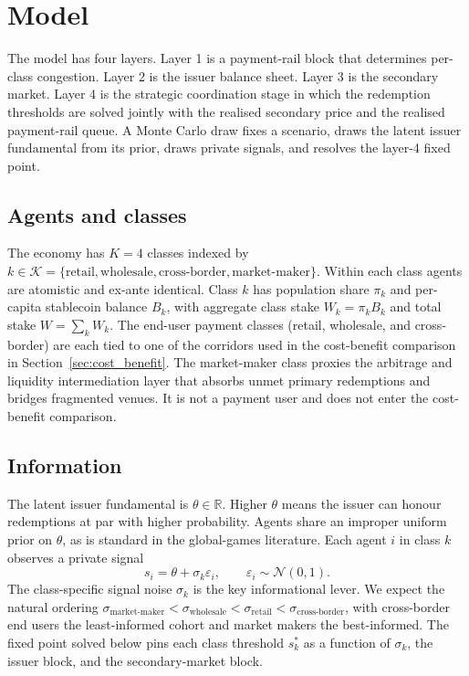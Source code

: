 \section{Model}\label{sec:model}

The model has four layers. Layer 1 is a payment-rail block that determines per-class congestion. Layer 2 is the issuer balance sheet. Layer 3 is the secondary market. Layer 4 is the strategic coordination stage in which the redemption thresholds are solved jointly with the realised secondary price and the realised payment-rail queue. A Monte Carlo draw fixes a scenario, draws the latent issuer fundamental from its prior, draws private signals, and resolves the layer-4 fixed point.

\subsection{Agents and classes}\label{sub:agents}

The economy has $K=4$ classes indexed by $k \in \mathcal{K} = \{\text{retail}, \text{wholesale}, \text{cross-border}, \text{market-maker}\}$. Within each class agents are atomistic and ex-ante identical. Class $k$ has population share $\pi_k$ and per-capita stablecoin balance $B_k$, with aggregate class stake $W_k = \pi_k B_k$ and total stake $W = \sum_k W_k$. The end-user payment classes (retail, wholesale, and cross-border) are each tied to one of the corridors used in the cost-benefit comparison in Section~\ref{sec:cost_benefit}. The market-maker class proxies the arbitrage and liquidity intermediation layer that absorbs unmet primary redemptions and bridges fragmented venues. It is not a payment user and does not enter the cost-benefit comparison.

\subsection{Information}\label{sub:information}

The latent issuer fundamental is $\theta \in \mathbb{R}$. Higher $\theta$ means the issuer can honour redemptions at par with higher probability. Agents share an improper uniform prior on $\theta$, as is standard in the global-games literature. Each agent $i$ in class $k$ observes a private signal
\begin{equation}\label{eq:signal}
s_i = \theta + \sigma_k \varepsilon_i, \qquad \varepsilon_i \sim \mathcal{N}(0,1).
\end{equation}
The class-specific signal noise $\sigma_k$ is the key informational lever. We expect the natural ordering $\sigma_{\text{market-maker}} < \sigma_{\text{wholesale}} < \sigma_{\text{retail}} < \sigma_{\text{cross-border}}$, with cross-border end users the least-informed cohort and market makers the best-informed. The fixed point solved below pins each class threshold $s^*_k$ as a function of $\sigma_k$, the issuer block, and the secondary-market block.

